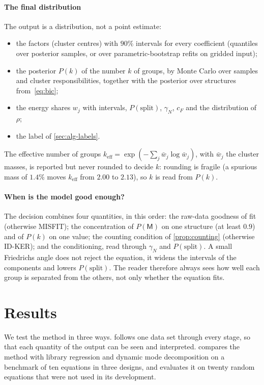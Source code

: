 \documentclass[11pt]{article}
\theoremstyle{plain}
\theoremstyle{definition}
\theoremstyle{remark}
\newcommand{\cF}{c_{F}}                     %
\newcommand{\gN}{\gamma_{N}}                %
\newcommand{\keff}{k_{\mathrm{eff}}}        %
\newcommand{\Mfit}{\mathsf{M}}              %
\newcommand{\lab}[1]{\textsf{#1}}           %
\newcommand{\IDK}{\lab{ID-KER}}
\newcommand{\MIS}{\lab{MISFIT}}
\begin{document}
\paragraph{The final distribution}
The output is a distribution, not a point estimate:
\begin{itemize}
  \item the factors (cluster centres) with $90\%$ intervals for every coefficient (quantiles over posterior samples, or over
  parametric-bootstrap refits on gridded input);
  \item the posterior $P(k)$ of the number $k$ of groups, by Monte Carlo over samples and cluster
  responsibilities, together with the posterior over structures from~\eqref{eq:bic};
  \item the energy shares $w_j$ with intervals, $P(\text{split})$, $\gN$, $\cF$ and the distribution of $\rho$;
  \item the label of \cref{sec:alg-labels}.
\end{itemize}
The effective number of groups $\keff=\exp(-\sum_j\bar w_j\log\bar w_j)$, with $\bar w_j$ the cluster masses, is reported
but never rounded to decide $k$: rounding is fragile (a spurious mass of $1.4\%$ moves $\keff$ from $2.00$ to
$2.13$), so $k$ is read from $P(k)$.

\paragraph{When is the model good enough?}
The decision combines four quantities, in this order: the raw-data goodness of fit (otherwise \MIS); the
concentration of $P(\Mfit)$ on one structure (at least $0.9$) and of $P(k)$ on one value; the counting
condition of \cref{prop:counting} (otherwise \IDK); and the conditioning, read through $\gN$ and
$P(\text{split})$. A small Friedrichs angle does not reject the equation, it widens the intervals of the
components and lowers $P(\text{split})$. The reader therefore always sees how well each group is
separated from the others, not only whether the equation fits.



\section{Results}\label{sec:results}
We test the method in three ways.  follows one data set through every stage, so that each quantity of
the output can be seen and interpreted.  compares the method with library regression and dynamic mode
decomposition on a benchmark of ten equations in three designs, and evaluates it on twenty random equations that were
not used in its development.
\end{document}
